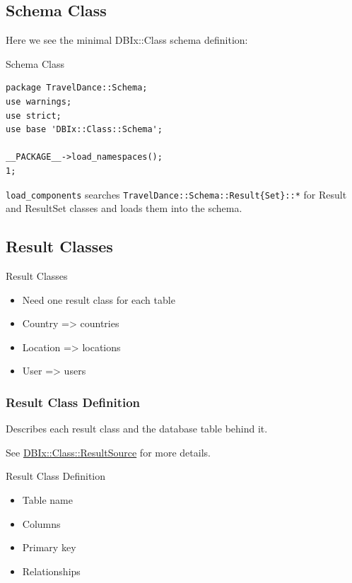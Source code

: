 \subsection{Schema Class}

Here we see the minimal DBIx::Class schema definition:

\begin{frame}[fragile]{Schema Class}
\begin{lstlisting}
package TravelDance::Schema;
use warnings;
use strict;
use base 'DBIx::Class::Schema';

__PACKAGE__->load_namespaces();
1;
\end{lstlisting}
\end{frame}

\verb|load_components| searches \verb|TravelDance::Schema::Result{Set}::*|
for Result and ResultSet classes and loads them into the schema.

\subsection{Result Classes}

\begin{frame}{Result Classes}
\begin{itemize}
\item Need one result class for each table
\item Country => countries
\item Location => locations
\item User => users
\end{itemize}
\end{frame}

\subsubsection{Result Class Definition}
Describes each result class and the database table behind it. 

See \href{https://metacpan.org/pod/DBIx::Class::ResultSource}{DBIx::Class::ResultSource} for more details.

\begin{frame}{Result Class Definition}

\begin{itemize}
\item Table name
\item Columns
\item Primary key
\item Relationships
\end{itemize}
\end{frame}

